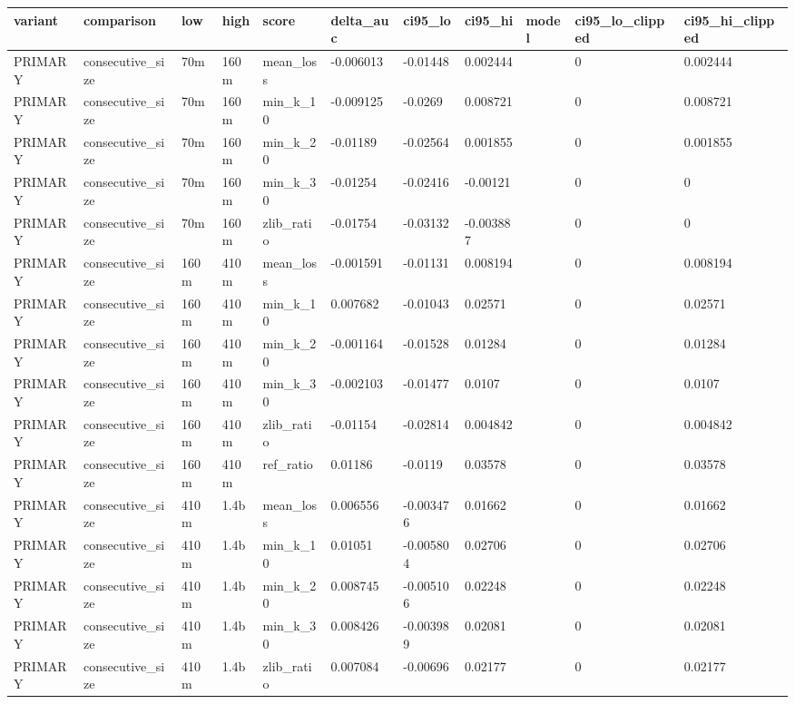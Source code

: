 \begin{tabular}{lllllllllll}
\toprule
variant & comparison & low & high & score & delta\_auc & ci95\_lo & ci95\_hi & model & ci95\_lo\_clipped & ci95\_hi\_clipped \\
\midrule
PRIMARY & consecutive\_size & 70m & 160m & mean\_loss & -0.006013 & -0.01448 & 0.002444 &  & 0 & 0.002444 \\
PRIMARY & consecutive\_size & 70m & 160m & min\_k\_10 & -0.009125 & -0.0269 & 0.008721 &  & 0 & 0.008721 \\
PRIMARY & consecutive\_size & 70m & 160m & min\_k\_20 & -0.01189 & -0.02564 & 0.001855 &  & 0 & 0.001855 \\
PRIMARY & consecutive\_size & 70m & 160m & min\_k\_30 & -0.01254 & -0.02416 & -0.00121 &  & 0 & 0 \\
PRIMARY & consecutive\_size & 70m & 160m & zlib\_ratio & -0.01754 & -0.03132 & -0.003887 &  & 0 & 0 \\
PRIMARY & consecutive\_size & 160m & 410m & mean\_loss & -0.001591 & -0.01131 & 0.008194 &  & 0 & 0.008194 \\
PRIMARY & consecutive\_size & 160m & 410m & min\_k\_10 & 0.007682 & -0.01043 & 0.02571 &  & 0 & 0.02571 \\
PRIMARY & consecutive\_size & 160m & 410m & min\_k\_20 & -0.001164 & -0.01528 & 0.01284 &  & 0 & 0.01284 \\
PRIMARY & consecutive\_size & 160m & 410m & min\_k\_30 & -0.002103 & -0.01477 & 0.0107 &  & 0 & 0.0107 \\
PRIMARY & consecutive\_size & 160m & 410m & zlib\_ratio & -0.01154 & -0.02814 & 0.004842 &  & 0 & 0.004842 \\
PRIMARY & consecutive\_size & 160m & 410m & ref\_ratio & 0.01186 & -0.0119 & 0.03578 &  & 0 & 0.03578 \\
PRIMARY & consecutive\_size & 410m & 1.4b & mean\_loss & 0.006556 & -0.003476 & 0.01662 &  & 0 & 0.01662 \\
PRIMARY & consecutive\_size & 410m & 1.4b & min\_k\_10 & 0.01051 & -0.005804 & 0.02706 &  & 0 & 0.02706 \\
PRIMARY & consecutive\_size & 410m & 1.4b & min\_k\_20 & 0.008745 & -0.005106 & 0.02248 &  & 0 & 0.02248 \\
PRIMARY & consecutive\_size & 410m & 1.4b & min\_k\_30 & 0.008426 & -0.003989 & 0.02081 &  & 0 & 0.02081 \\
PRIMARY & consecutive\_size & 410m & 1.4b & zlib\_ratio & 0.007084 & -0.00696 & 0.02177 &  & 0 & 0.02177 \\

\end{tabular}
